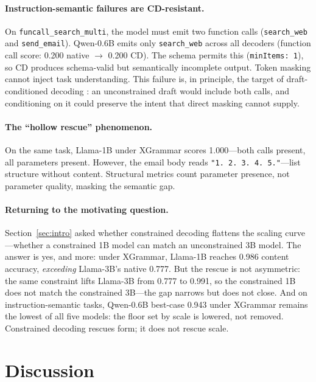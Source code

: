 \documentclass[11pt]{article}
\newcommand{\cd}{constrained decoding}
\newcommand{\CD}{Constrained decoding}
\begin{document}
\paragraph{Instruction-semantic failures are CD-resistant.}
On \texttt{funcall\_search\_multi}, the model must emit two function calls (\texttt{search\_web} and \texttt{send\_email}).
Qwen-0.6B emits only \texttt{search\_web} across all decoders (function call score: 0.200 native $\to$ 0.200 CD).
The schema permits this (\texttt{minItems: 1}), so CD produces schema-valid but semantically incomplete output.
Token masking cannot inject task understanding.
This failure is, in principle, the target of draft-conditioned decoding \citep{reddy2026dccd}: an unconstrained draft would include both calls, and conditioning on it could preserve the intent that direct masking cannot supply.

\paragraph{The ``hollow rescue'' phenomenon.}
On the same task, Llama-1B under XGrammar scores 1.000---both calls present, all parameters present.
However, the email body reads \texttt{"1.\ 2.\ 3.\ 4.\ 5."}---list structure without content.
Structural metrics count parameter presence, not parameter quality, masking the semantic gap.

\paragraph{Returning to the motivating question.}
Section~\ref{sec:intro} asked whether \cd{} flattens the scaling curve---whether a constrained 1B model can match an unconstrained 3B model.
The answer is yes, and more: under XGrammar, Llama-1B reaches 0.986 content accuracy, \emph{exceeding} Llama-3B's native 0.777.
But the rescue is not asymmetric: the same constraint lifts Llama-3B from 0.777 to 0.991, so the constrained 1B does not match the constrained 3B---the gap narrows but does not close.
And on instruction-semantic tasks, Qwen-0.6B best-case 0.943 under XGrammar remains the lowest of all five models: the floor set by scale is lowered, not removed.
\CD{} rescues form; it does not rescue scale.

\section{Discussion}
\label{sec:discussion}
\end{document}
